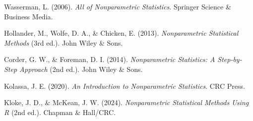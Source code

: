\documentclass{arabicClass}
\begin{document}
	
	
	
\tableofcontents
\clearpage
{}


	
	
	
	
	
	

	\begin{thebibliography}{9}
		\begin{english}
		Wasserman, L. (2006).
		\textit{All of Nonparametric Statistics}.
		Springer Science \& Business Media.
		
		Hollander, M., Wolfe, D. A., \& Chicken, E. (2013).
		\textit{Nonparametric Statistical Methods} (3rd ed.).
		John Wiley \& Sons.
		
		Corder, G. W., \& Foreman, D. I. (2014).
		\textit{Nonparametric Statistics: A Step-by-Step Approach} (2nd ed.).
		John Wiley \& Sons.
		
		Kolassa, J. E. (2020).
		\textit{An Introduction to Nonparametric Statistics}.
		CRC Press.
		
		Kloke, J. D., \& McKean, J. W. (2024).
		\textit{Nonparametric Statistical Methods Using R} (2nd ed.).
		Chapman \& Hall/CRC.
	\end{english}
	\end{thebibliography}

	
   
\end{document}
